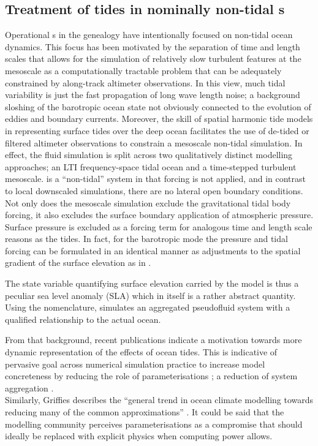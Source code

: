 \subsection{Treatment of tides in nominally non-tidal \OGCM{}s}
\label{sec:tides_ogcm}
Operational \OGCM{}s in the \GODAE{} genealogy have intentionally focused on non-tidal ocean dynamics. This focus has been motivated by the separation of time and length scales that allows for the simulation of relatively slow turbulent features at the mesoscale as a computationally tractable problem that can be adequately constrained by along-track altimeter observations.
In this view, much tidal variability is just the fast propagation of long wave length noise; a background sloshing of the barotropic ocean state not obviously connected to the evolution of eddies and boundary currents.
Moreover, the skill of spatial harmonic tide models in representing surface tides over the deep ocean facilitates the use of de-tided or filtered altimeter observations to constrain a mesoscale non-tidal simulation. In effect, the fluid simulation is split across two qualitatively distinct modelling approaches; an LTI frequency-space tidal ocean and a time-stepped turbulent mesoscale.  
\BL{} is a ``non-tidal'' system in that \ATGP{} forcing is not applied, and in contrast to local downscaled simulations, there are no lateral open boundary conditions. Not only does the mesoscale simulation exclude the gravitational tidal body forcing, it also excludes the surface boundary application of atmospheric pressure.   
Surface pressure is excluded as a forcing term for analogous time and length scale reasons as the tides.  In fact, for the barotropic mode the pressure and tidal forcing can be formulated in an identical manner as adjustments to the spatial gradient of the surface elevation as in \citet[equation 9.9.5]{gill1982atmosphere}.

The state variable quantifying surface elevation carried by the model is thus a peculiar sea level anomaly (SLA) which in itself is a rather abstract quantity. 
Using the \citet{Stevens:2001kb} nomenclature, \BL{} simulates an aggregated pseudofluid system with a qualified relationship to the actual ocean.


From that background, recent publications indicate a motivation towards more dynamic representation of the effects of ocean tides.   This is indicative of pervasive goal across numerical simulation practice to increase model concreteness by reducing the role of parameterisations \citep[section 5.3]{Petersen:2012tr}; a reduction of system aggregation \citep{Stevens:2001kb}.\\
Similarly, Griffies describes the ``general trend in ocean climate modelling towards reducing many of the common approximations'' \citep[pp20] {Griffies:2004vs}.   It could be said that the modelling community perceives parameterisations as a compromise that should ideally be replaced with explicit physics when computing power allows.

